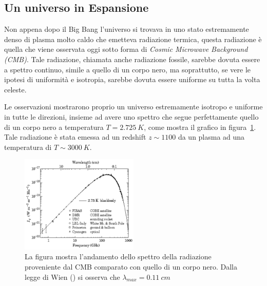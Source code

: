\subsection{Un universo in Espansione}\label{sec:unverso-espansione}
Non appena dopo il Big Bang l'universo si trovava in uno stato estremamente denso di plasma molto caldo che emetteva radiazione termica, questa radiazione è quella che viene osservata oggi sotto forma di \textit{Cosmic Microwave Background (CMB)}. Tale radiazione, chiamata anche radiazione fossile, sarebbe dovuta essere a spettro continuo, simile a quello di un corpo nero, ma soprattutto, se vere le ipotesi di uniformità e isotropia, sarebbe dovuta essere uniforme su tutta la volta celeste. 

Le osservazioni mostrarono proprio un universo estremamente isotropo e uniforme in tutte le direzioni, insieme ad avere uno spettro che segue perfettamente quello di un corpo nero a temperatura $T = \SI{2.725}{K}$, come mostra il grafico in figura~\ref{fig:balckbody-universe}. Tale radiazione è stata emessa ad un redshift $z \sim 1100$ da un plasma ad una temperatura di $T \sim \SI{3000}{K}$.
\begin{figure}
    \centering
    \includegraphics[width = 0.5\textwidth]{immagini/blackbody-universe.png}
    \caption{La figura mostra l'andamento dello spettro della radiazione proveniente dal CMB comparato con quello di un corpo nero. Dalla legge di Wien () si osserva che $\lambda_{max}= \SI{0.11}{cm}$}\label{fig:balckbody-universe}
\end{figure}

